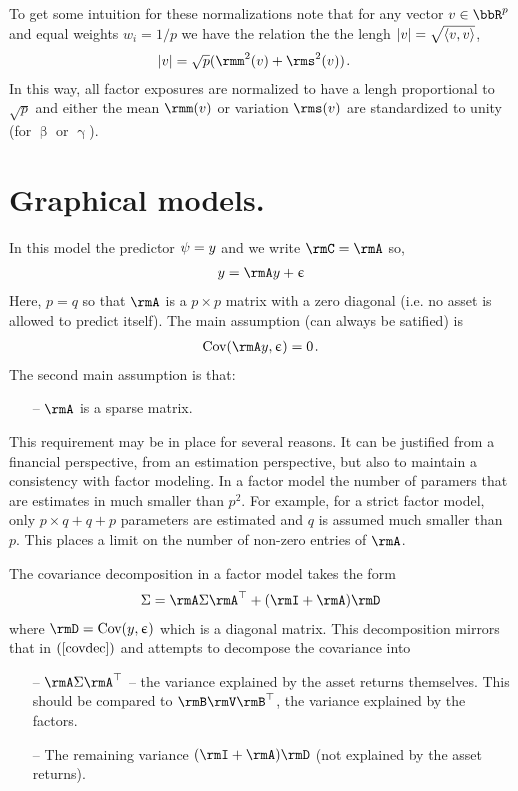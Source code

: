 \documentclass[leqno,12pt]{article}
\begin{document}
{To get some intuition for these normalizations note that
for any vector $v \in \bbR^p$ and equal weights $w_i =1/p$ 
we have the relation the the lengh $|v| = \sqrt{\langle v , v \rangle}$,
\begin{align}
 |v| &= \sqrt{p} ( \rmm^2(v) + \rms^2(v) ) \s .
\end{align}
In this way, all factor exposures are normalized to have
a lengh proportional to $\sqrt{p}$ and either the mean
$\rmm(v)$ or variation 
$\rms(v)$ are standardized to unity (for $\upbeta$ or 
$\upgamma$).


\section{Graphical models.}\label{sec:gm} 
In this model the predictor
$\psi = y$ and we write $\rmC = \rmA$ so,
\begin{align}
  y = \rmA y + \res
\end{align}
Here, $p = q$ so that $\rmA$ is a $p \times p$ matrix 
with a zero diagonal (i.e. no asset is allowed to predict
itself). The main assumption (can always be satified) is
\begin{align}
  \Cov (\rmA y , \res) = 0 \s .
\end{align}
The second main assumption is that:
\begin{itemize}
 \item[--] $\rmA$ is a sparse matrix.
\end{itemize}
This requirement may be in place for several reasons. It
can be justified from a financial perspective, from an
 estimation perspective, but also to maintain
a consistency with factor modeling. In a factor model
the number of paramers that are estimates in much smaller
than $p^2$. For example, for a strict factor model, only
$p \times q + q + p$ parameters are estimated and $q$ 
is assumed much smaller than $p$. This places a limit on the 
number of non-zero entries of $\rmA$.


The covariance decomposition in a factor model takes the form
\begin{align}
  \tcov = \rmA \tcov \rmA^\top + (\rmI + \rmA) \rmD
\end{align}
where $\rmD = \Cov(y,\res)$ which is a diagonal matrix. This
decomposition mirrors that in $\req{covdec}$ and attempts to
decompose the covariance into
\begin{itemize}
\item[--] $\rmA \tcov \rmA^\top$ -- the variance explained by
the asset returns themselves. This should be compared to
$\rmB \rmV \rmB^\top$, the variance explained by the
factors.
\item[--] The remaining variance $(\rmI + \rmA)\rmD$ 
(not explained by the asset returns).
\end{itemize}

}
\end{document}
